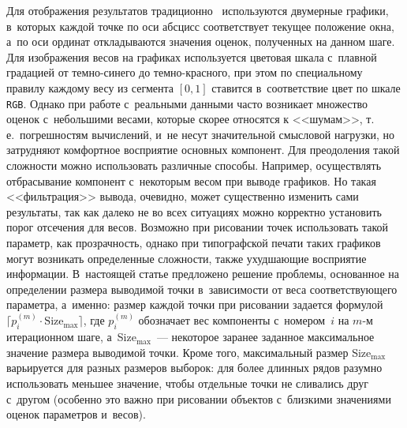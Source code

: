 \begin{multicols}{2}
Для отображения результатов традиционно~\cite{Korolev2011} используются двумерные графики, в~которых
каж\-дой точке по оси абсцисс соответствует текущее положение окна, а~по оси ординат
откладываются значения оценок, полученных на данном шаге. Для изображения весов на графиках
используется цветовая шкала с~плавной градацией от тем\-но-си\-не\-го до
тем\-но-крас\-но\-го, при этом по
специальному правилу каждому весу из сегмента $[0,1]$ ставится в~соответствие цвет по шкале
\verb"RGB". Однако при работе с~реальными данными часто возникает множество оценок с~небольшими
весами, которые скорее относятся к <<шумам>>, т.\,е.\ погрешностям вычислений, и~не несут
значительной смысловой нагрузки, но затрудняют комфортное восприятие основных компонент.
%
Для
преодоления такой сложности можно использовать различные способы. Например, осуществлять отбрасывание
компонент с~некоторым весом при выводе графиков. Но такая <<фильтрация>> вывода, очевидно, может
существенно изменить сами результаты, так как далеко не во всех ситуациях можно корректно установить
порог отсечения для весов. Возможно при рисовании точек использовать такой параметр, как
прозрачность, однако при типографской печати таких графиков могут возникать определенные сложности,
также ухудшающие восприятие информации. В~на\-сто\-ящей статье предложено решение проблемы,
основанное на определении размера выводимой точки в~зависимости от веса соответствующего параметра,
а~именно: размер каждой точки при рисовании задается формулой $\lceil p_i^{(m)}
\cdot\mathrm{Size}_{\max}\rceil$, где $p_i^{(m)}$ обозначает вес компоненты с~номером~$i$ на $m$-м итерационном
шаге, а~Size$_{\max}$~--- некоторое заранее заданное максимальное значение размера выводимой точки.
Кроме того, максимальный размер Size$_{\max}$ варьируется для разных размеров выборок: для более
длинных рядов разумно использовать меньшее значение, чтобы отдельные точки не сливались друг с~другом
(особенно это важно при рисовании объектов с~близкими значениями оценок параметров и~весов).

\begin{figure*}[b] %
\vspace*{-3pt}
 \begin{center}
 \mbox{%
 \epsfxsize=160mm
 }
 \end{center}
 \vspace*{-9pt}
\label{Diff}
\end{figure*}

\vspace*{-4pt}


\end{multicols}
